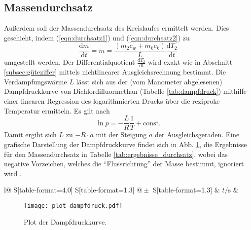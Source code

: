 \subsection{Massendurchsatz}
  Außerdem soll der Massendurchsatz des Kreislaufes ermittelt werden. Dies geschieht, indem (\ref{eqn:durchsatz1}) und (\ref{eqn:durchsatz2}) zu
  \begin{equation}
    \frac{\mathrm{d}m}{\mathrm{d}t} = \dot m = \frac{(m_{2} c_w + m_k c_k)}{L}\frac {\mathrm{d}T_{2}}{\mathrm{d}t}
  \end{equation}
  umgestellt werden. Der Differentialquotient $\frac {\mathrm{d}T_{2}}{\mathrm{d}t}$ wird exakt wie in Abschnitt \ref{subsec:güteziffer} mittels nichtlinearer Ausgleichsrechnung bestimmt. Die Verdampfungswärme $L$ lässt sich aus der (vom Manometer abgelesenen) Dampfdruckkurve von Dichlordifluormethan (Tabelle \ref{tab:dampfdruck}) mithilfe einer linearen Regression des logarithmierten Drucks über die reziproke Temperatur ermitteln. Es gilt nach \cite{anleitung203}
  \begin{equation}
    \ln p = -\frac{L}{R} \frac {1}{T} + \mathrm{const.}
  \end{equation}
  Damit ergibt sich $L$ zu $-R \cdot a$ mit der Steigung $a$ der Ausgleichsgeraden. Eine grafische Darstellung der Dampfdruckkurve findet sich in Abb. \ref {fig:dampfdruck}, die Ergebnisse für den Massendurchsatz in Tabelle \ref{tab:ergebnisse_durchsatz}, wobei das negative Vorzeichen, welches die \enquote{Flussrichtung} der Masse bestimmt, ignoriert wird .

  \begin{table}
    \centering
    \caption{Ermittelte Massendurchsätze.}
    \label{tab:ergebnisse_durchsatz}
    \begin{tabular}{
        l@{}
        S[table-format=4.0]
        S[table-format=1.3] @{${}\pm{}$} S[table-format=1.3]}
      \toprule
      & $t / \si{\second}$
      &  \\
      \midrule
      
      \bottomrule
    \end{tabular}
  \end{table}

  \begin{figure}
    \centering
    \texttt{[image: plot\_dampfdruck.pdf]}
    \caption{Plot der Dampfdruckkurve.}
    \label{fig:dampfdruck}
  \end{figure}

